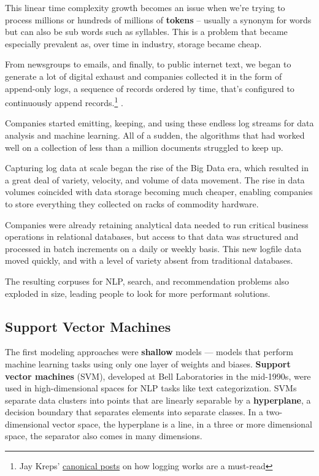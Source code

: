 \documentclass[11pt, table]{diazessay} %
\begin{document}
\begin{sloppypar}
This linear time complexity growth becomes an issue when we're trying to process millions or hundreds of millions of \textbf{tokens} -- usually a synonym for words but can also be sub words such as syllables. This is a problem that became especially prevalent as, over time in industry, storage became cheap. 

From newsgroups to emails, and finally, to public internet text, we began to generate a lot of digital exhaust and companies collected it in the form of append-only logs\citep{kreps2014heart}, a sequence of records ordered by time, that's configured to continuously append records.\footnote{Jay Kreps' \href{https://engineering.linkedin.com/distributed-systems/log-what-every-software-engineer-should-know-about-real-time-datas-unifying}{canonical posts} on how logging works are a must-read} . 

Companies started emitting, keeping, and using these endless log streams for data analysis and machine learning. All of a sudden, the algorithms that had worked well on a collection of less than a million documents struggled to keep up. 

Capturing log data at scale began the rise of the Big Data era, which resulted in a great deal of variety, velocity, and volume of data movement. The rise in data volumes coincided with data storage becoming much cheaper, enabling companies to store everything they collected on racks of commodity hardware. 

Companies were already retaining analytical data needed to run critical business operations in relational databases, but access to that data was structured and processed in batch increments on a daily or weekly basis. This new logfile data moved quickly, and with a level of variety absent from traditional databases. 

The resulting corpuses for NLP, search, and recommendation problems also exploded in size, leading people to look for more performant solutions.  


\subsection{Support Vector Machines}

The first modeling approaches were \textbf{shallow} models --- models that perform machine learning tasks using only one layer of weights and biases\citep{collobert2008unified}. \textbf{Support vector machines} (SVM), developed at Bell Laboratories in the mid-1990s,  were used in high-dimensional spaces for NLP tasks like text categorization\citep{joachims2005text}. SVMs separate data clusters into points that are linearly separable by a \textbf{hyperplane}, a decision boundary that separates elements into separate classes. In a two-dimensional vector space, the hyperplane is a line, in a three or more dimensional space, the separator also comes in many dimensions. 


\end{sloppypar}
\end{document}
